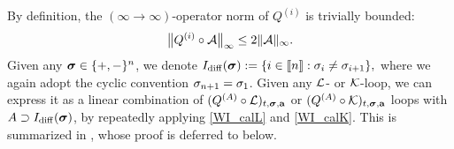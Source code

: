 By definition, the $(\infty\to \infty)$-operator norm of $Q^{(i)}$ is trivially bounded:
\begin{align}\label{normQA2}
\big\|Q^{(i)}\circ \cal A\big\|_{\infty} \le 2\|\cal A\|_\infty .
\end{align}
Given any $\bsig\in \{+,-\}^n$, we denote
\( I_{\mathrm{diff}}(\bsig):=\{i\in\qqq{n}:\sig_i\ne\sig_{i+1}\},\)
where we again adopt the cyclic convention $\sig_{n+1}=\sig_1$. Given any $\cL$- or $\cK$-loop, we can express it as a linear combination of $(Q^{(A)}\circ \cL)_{t,\bsig,\ba}$ or $(Q^{(A)}\circ \cK)_{t,\bsig,\ba}$ loops with $A\supset I_{\mathrm{diff}}(\bsig)$, by repeatedly applying \eqref{WI_calL} and \eqref{WI_calK}. 
This is summarized in , whose proof is deferred to  below.




